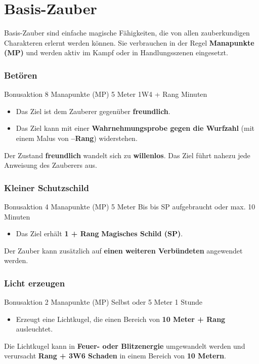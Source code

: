 \section{Basis-Zauber}

Basis-Zauber sind einfache magische Fähigkeiten, die von allen
zauberkundigen Charakteren erlernt werden können.
Sie verbrauchen in der Regel \textbf{Manapunkte (MP)} und werden aktiv
im Kampf oder in Handlungsszenen eingesetzt.

\subsubsection*{Betören}

\spellcard
{}
{Bonusaktion}
{8 Manapunkte (MP)}
{5 Meter}
{1W4 + Rang Minuten}
{
	\begin{itemize}
		\item Das Ziel ist dem Zauberer gegenüber \textbf{freundlich}.
		\item Das Ziel kann mit einer \textbf{Wahrnehmungsprobe gegen die Wurfzahl}
		(mit einem Malus von \textbf{–Rang}) widerstehen.
	\end{itemize}
}
{
	Der Zustand \textbf{freundlich} wandelt sich zu \textbf{willenlos}.
	Das Ziel führt nahezu jede Anweisung des Zauberers aus.
}

\subsubsection*{Kleiner Schutzschild}

\spellcard
{}
{Bonusaktion}
{4 Manapunkte (MP)}
{5 Meter}
{Bis bis SP aufgebraucht oder max. 10 Minuten}
{
	\begin{itemize}
		\item Das Ziel erhält \textbf{1 + Rang} \textbf{Magisches Schild (SP)}.
	\end{itemize}
}
{
	Der Zauber kann zusätzlich auf \textbf{einen weiteren Verbündeten}
	angewendet werden.
}


\subsubsection*{Licht erzeugen}

\spellcard
{}
{Bonusaktion}
{2 Manapunkte (MP)}
{Selbst oder 5 Meter}
{1 Stunde}
{
	\begin{itemize}
		\item Erzeugt eine Lichtkugel, die einen Bereich von
		\textbf{10 Meter + Rang} ausleuchtet.
	\end{itemize}
}
{
	Die Lichtkugel kann in \textbf{Feuer- oder Blitzenergie}
	umgewandelt werden und verursacht
	\textbf{Rang + 3W6 Schaden} in einem Bereich von \textbf{10 Metern}.
}


